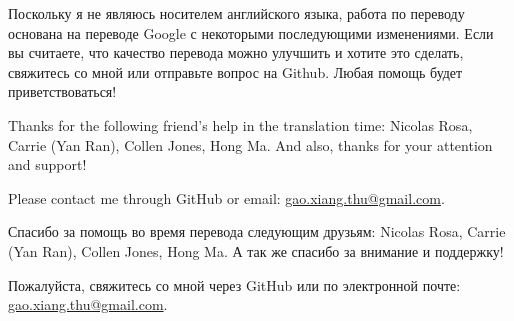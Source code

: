 \begin{Russian}
    Поскольку я не являюсь носителем английского языка, работа по переводу основана на переводе Google с некоторыми последующими изменениями. Если вы считаете, что качество перевода можно улучшить и хотите это сделать, свяжитесь со мной или отправьте вопрос на Github. Любая помощь будет приветствоваться!
\end{Russian}

\begin{English}
    Thanks for the following friend's help in the translation time: Nicolas Rosa, Carrie (Yan Ran), Collen Jones, Hong Ma. And also, thanks for your attention and support!

    Please contact me through GitHub or email: \href{mailto:gao.xiang.thu@gmail.com}{gao.xiang.thu@gmail.com}.
\end{English}

\begin{Russian}
    Спасибо за помощь во время перевода следующим друзьям: Nicolas Rosa, Carrie (Yan Ran), Collen Jones, Hong Ma. А так же спасибо за внимание и поддержку!

    Пожалуйста, свяжитесь со мной через GitHub или по электронной почте: \href{mailto:gao.xiang.thu@gmail.com}{gao.xiang.thu@gmail.com}.
\end{Russian}